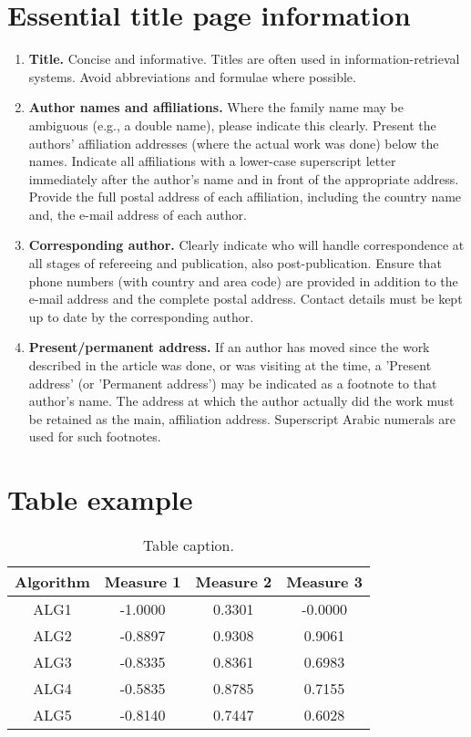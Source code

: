 \documentclass[review]{elsarticle}
\begin{document}
	\section{Essential title page information}
	\label{title_page}
	
	\begin{enumerate}
		\item \textbf{Title.} Concise and informative. Titles are often used in information-retrieval systems. Avoid abbreviations and formulae where possible.
		\item \textbf{Author names and affiliations.} Where the family name may be ambiguous (e.g., a double name), please indicate this clearly. Present the authors' affiliation addresses (where the actual work was done) below the names. Indicate all affiliations with a lower-case superscript letter immediately after the author's name and in front of the appropriate address. Provide the full postal address of each affiliation, including the country name and, the e-mail address of each author.
		\item \textbf{Corresponding author.} Clearly indicate who will handle correspondence at all stages of refereeing and publication, also post-publication. Ensure that phone numbers (with country and area code) are provided in addition to the e-mail address and the complete postal address. Contact details must be kept up to date by the corresponding author.
		\item \textbf{Present/permanent address.} If an author has moved since the work described in the article was done, or was visiting at the time, a 'Present address' (or 'Permanent address') may be indicated as a footnote to that author's name. The address at which the author actually did the work must be retained as the main, affiliation address. Superscript Arabic numerals are used for such footnotes.
	\end{enumerate}
	
	\section{Table example}
	
	\begin{table}[H]
		\caption{Table caption.}
		\centering
		\begin{tabular}{|c|ccc|}
			\hline
			Algorithm & Measure 1 & Measure 2 & Measure 3 \\ \hline
			ALG1 &-1.0000&0.3301&-0.0000 \\ \hline
			ALG2 & -0.8897 &0.9308&0.9061 \\ \hline
			ALG3 & -0.8335&0.8361&0.6983 \\ \hline
			ALG4 & -0.5835&0.8785&0.7155 \\ \hline
			ALG5 & -0.8140&0.7447&0.6028 \\ \hline
		\end{tabular}
		
	\end{table}
	
\end{document}
